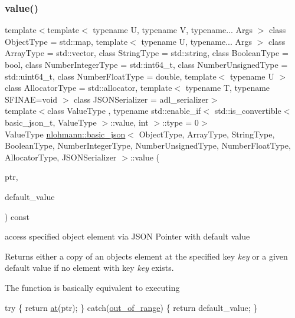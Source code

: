 \subsubsection{\texorpdfstring{value()}{value()}\hspace{0.1cm}{\footnotesize\ttfamily [3/4]}}
{\footnotesize\ttfamily template$<$template$<$ typename U, typename V, typename... Args $>$ class Object\+Type = std\+::map, template$<$ typename U, typename... Args $>$ class Array\+Type = std\+::vector, class String\+Type  = std\+::string, class Boolean\+Type  = bool, class Number\+Integer\+Type  = std\+::int64\+\_\+t, class Number\+Unsigned\+Type  = std\+::uint64\+\_\+t, class Number\+Float\+Type  = double, template$<$ typename U $>$ class Allocator\+Type = std\+::allocator, template$<$ typename T, typename S\+F\+I\+N\+A\+E=void $>$ class J\+S\+O\+N\+Serializer = adl\+\_\+serializer$>$ \\
template$<$class Value\+Type , typename std\+::enable\+\_\+if$<$ std\+::is\+\_\+convertible$<$ basic\+\_\+json\+\_\+t, Value\+Type $>$\+::value, int $>$\+::type  = 0$>$ \\
Value\+Type \mbox{\hyperlink{classnlohmann_1_1basic__json}{nlohmann\+::basic\+\_\+json}}$<$ Object\+Type, Array\+Type, String\+Type, Boolean\+Type, Number\+Integer\+Type, Number\+Unsigned\+Type, Number\+Float\+Type, Allocator\+Type, J\+S\+O\+N\+Serializer $>$\+::value (\begin{DoxyParamCaption}\item[{const \mbox{\hyperlink{classnlohmann_1_1basic__json_a6886a5001f5b449ad316101a311ce536}{json\+\_\+pointer}} \&}]{ptr,  }\item[{const Value\+Type \&}]{default\+\_\+value }\end{DoxyParamCaption}) const\hspace{0.3cm}{\ttfamily [inline]}}



access specified object element via J\+S\+ON Pointer with default value 

Returns either a copy of an object\textquotesingle{}s element at the specified key {\itshape key} or a given default value if no element with key {\itshape key} exists.

The function is basically equivalent to executing 
\begin{DoxyCode}
\textcolor{keywordflow}{try} \{
    \textcolor{keywordflow}{return} \mbox{\hyperlink{classnlohmann_1_1basic__json_a73ae333487310e3302135189ce8ff5d8}{at}}(ptr);
\} \textcolor{keywordflow}{catch}(\mbox{\hyperlink{classnlohmann_1_1basic__json_a28f7c2f087274a0012eb7a2333ee1580}{out\_of\_range}}) \{
    \textcolor{keywordflow}{return} default\_value;
\}
\end{DoxyCode}


